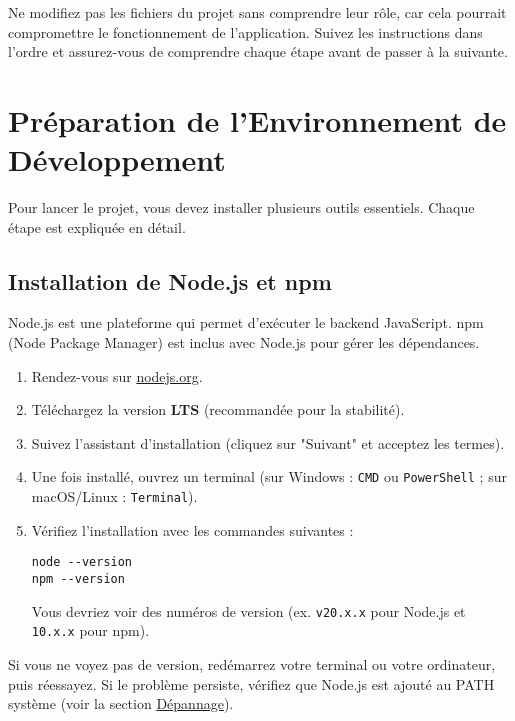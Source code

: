\documentclass[12pt, a4paper]{article}
\begin{document}
\begin{warningbox}
Ne modifiez pas les fichiers du projet sans comprendre leur rôle, car cela pourrait compromettre le fonctionnement de l'application. Suivez les instructions dans l'ordre et assurez-vous de comprendre chaque étape avant de passer à la suivante.
\end{warningbox}

\section{Préparation de l'Environnement de Développement}
Pour lancer le projet, vous devez installer plusieurs outils essentiels. Chaque étape est expliquée en détail.

\subsection{Installation de Node.js et npm}
\begin{stepbox}
Node.js est une plateforme qui permet d'exécuter le backend JavaScript. npm (Node Package Manager) est inclus avec Node.js pour gérer les dépendances.

\begin{enumerate}
  \item Rendez-vous sur \href{https://nodejs.org/}{nodejs.org}.
  \item Téléchargez la version \textbf{LTS} (recommandée pour la stabilité).
  \item Suivez l'assistant d'installation (cliquez sur "Suivant" et acceptez les termes).
  \item Une fois installé, ouvrez un terminal (sur Windows : \texttt{CMD} ou \texttt{PowerShell} ; sur macOS/Linux : \texttt{Terminal}).
  \item Vérifiez l'installation avec les commandes suivantes :
  \begin{lstlisting}
node --version
npm --version
  \end{lstlisting}
  Vous devriez voir des numéros de version (ex. \texttt{v20.x.x} pour Node.js et \texttt{10.x.x} pour npm).
\end{enumerate}
\end{stepbox}

\begin{notebox}
Si vous ne voyez pas de version, redémarrez votre terminal ou votre ordinateur, puis réessayez. Si le problème persiste, vérifiez que Node.js est ajouté au PATH système (voir la section \hyperref[sec:troubleshooting]{Dépannage}).
\end{notebox}
\end{document}
